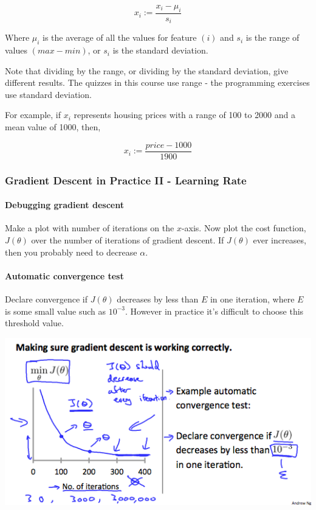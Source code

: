 \documentclass[UTF8]{article}
\begin{document}
\[ x_i := \dfrac{x_i - \mu_i}{s_i} \]

Where $\mu_i$ is the average of all the values for feature $(i)$ and $s_i$ is the range of values $(max - min)$, or $s_i$ is the standard deviation.

Note that dividing by the range, or dividing by the standard deviation, give different results. The quizzes in this course use range - the programming exercises use standard deviation.

For example, if $x_i$ represents housing prices with a range of 100 to 2000 and a mean value of 1000, then, 

\[ x_i := \dfrac{price-1000}{1900} \]

\subsubsection{Gradient Descent in Practice II - Learning Rate}

\paragraph{Debugging gradient descent} Make a plot with number of iterations on the $x$-axis. Now plot the cost function, $J(\theta)$ over the number of iterations of gradient descent. If $J(\theta)$ ever increases, then you probably need to decrease $\alpha$.

\paragraph{Automatic convergence test} Declare convergence if $J(\theta)$ decreases by less than $E$ in one iteration, where $E$ is some small value such as $10^{-3}$. However in practice it's difficult to choose this threshold value.

\includegraphics[width = \textwidth]{NotePics/4_2_2_1.png}
\end{document}
